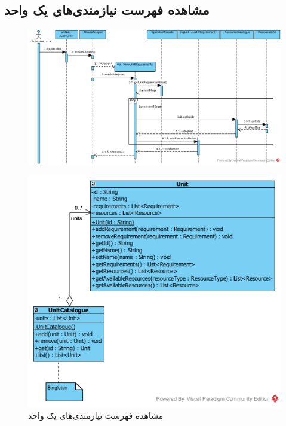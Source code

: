 \begin{landscape}
\section{مشاهده فهرست نیازمندی‌های یک واحد}
\begin{figure}[H]
	\centering
	\includegraphics[scale=0.8]{img/sequence-design/ViewListOfRequirements}
\end{figure}
\begin{figure}[H]
	\centering
	\includegraphics[scale=0.7]{img/sequence-design/ViewListOfRequirementsC}
	\caption{مشاهده فهرست نیازمندی‌های یک واحد}
\end{figure}

\newpage
\begin{landscape}

\end{landscape}
\end{landscape}
